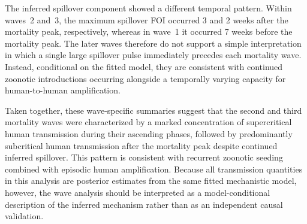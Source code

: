 The inferred spillover component showed a different temporal pattern.
Within waves~2 and~3, the maximum spillover FOI occurred
3 and
2 weeks after the mortality
peak, respectively, whereas in wave~1 it occurred
7 weeks before the mortality
peak. The later waves therefore do not support a simple interpretation in
which a single large spillover pulse immediately precedes each mortality
wave. Instead, conditional on the fitted model, they are consistent with
continued zoonotic introductions occurring alongside a temporally varying
capacity for human-to-human amplification.

Taken together, these wave-specific summaries suggest that the second and
third mortality waves were characterized by a marked concentration of
supercritical human transmission during their ascending phases, followed by
predominantly subcritical human transmission after the mortality peak despite
continued inferred spillover. This pattern is consistent with recurrent
zoonotic seeding combined with episodic human amplification. Because all
transmission quantities in this analysis are posterior estimates from the
same fitted mechanistic model, however, the wave analysis should be
interpreted as a model-conditional description of the inferred mechanism
rather than as an independent causal validation.

